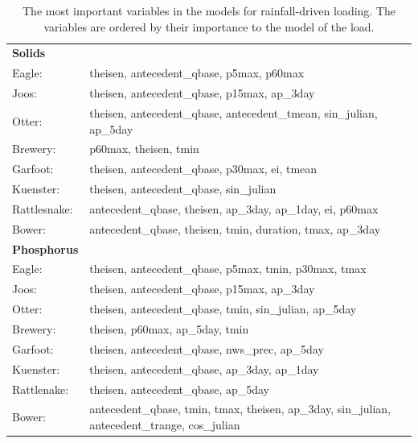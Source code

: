 \documentclass[12pt]{article}
\begin{document}
\begin{table}[h!]\small
    \begin{center}
    \begin{tabular}{ll}
        \textbf{Solids} & \\
        \hspace{5mm} Eagle: & theisen, antecedent\_qbase, p5max, p60max\\
        \hspace{5mm} Joos: & theisen, antecedent\_qbase, p15max, ap\_3day\\
        \hspace{5mm} Otter: & theisen, antecedent\_qbase, antecedent\_tmean, sin\_julian, ap\_5day\\
        \hspace{5mm} Brewery: & p60max, theisen, tmin\\
        \hspace{5mm} Garfoot: & theisen, antecedent\_qbase, p30max, ei, tmean\\
        \hspace{5mm} Kuenster: & theisen, antecedent\_qbase, sin\_julian\\
        \hspace{5mm} Rattlesnake: & antecedent\_qbase, theisen, ap\_3day, ap\_1day, ei, p60max \\
        \hspace{5mm} Bower: & antecedent\_qbase, theisen, tmin, duration, tmax, ap\_3day
    \vspace{2mm}\\
        \textbf{Phosphorus} & \\
        \hspace{5mm} Eagle: & theisen, antecedent\_qbase, p5max, tmin, p30max, tmax\\
        \hspace{5mm} Joos: & theisen, antecedent\_qbase, p15max, ap\_3day\\
        \hspace{5mm} Otter: & theisen, antecedent\_qbase, tmin, sin\_julian, ap\_5day\\
        \hspace{5mm} Brewery: & theisen, p60max, ap\_5day, tmin\\
        \hspace{5mm} Garfoot: & theisen, antecedent\_qbase, nws\_prec, ap\_5day\\
        \hspace{5mm} Kuenster: & theisen, antecedent\_qbase, ap\_3day, ap\_1day\\
        \hspace{5mm} Rattlenake: & theisen, antecedent\_qbase, ap\_5day\\
        \hspace{5mm} Bower: & antecedent\_qbase, tmin, tmax, theisen, ap\_3day, sin\_julian, antecedent\_trange, cos\_julian\\
    \end{tabular}
    \caption{The most important variables in the models for rainfall-driven loading. The variables are ordered by their importance to the model of the load. \label{nosnow_predictor_list}}
    \end{center}
\end{table}
\end{document}
